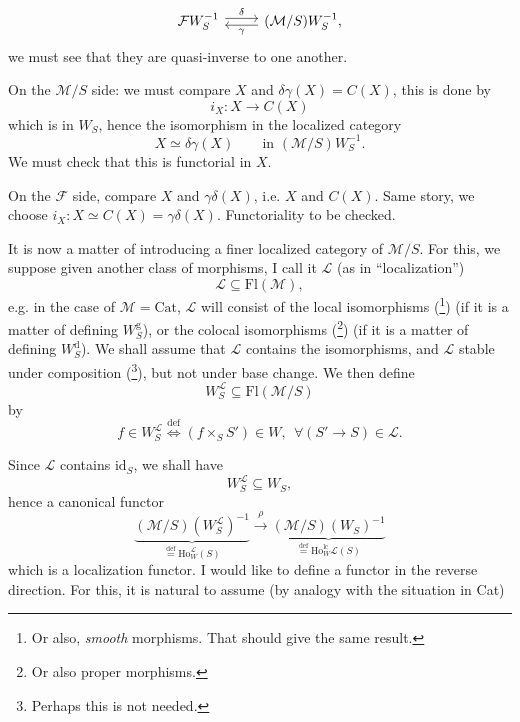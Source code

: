 \documentclass[11pt]{article}
\newcommand{\printedpage}[1]{\marginpar{\footnotesize p.~#1}}
\newcommand{\msp}[1]{\marginpar{\footnotesize [#1]}}
\newcommand{\Ho}{\mathrm{Ho}}
\newcommand{\WL}{W_S^{\mathcal{L}}}
\newcommand{\defeq}{\overset{\text{def}}{=}}
\begin{document}
\printedpage{59}
\[
\begin{tikzcd}
\mathcal{F}W_S^{-1} \arrow[r, shift left, "\delta"] & (\mathcal{M}/S)W_S^{-1}, \arrow[l, shift left, "\gamma"]
\end{tikzcd}
\]
we must see that they are quasi-inverse to one \msp{page 94} another.

On the $\mathcal{M}/S$ side: we must compare $X$ and $\delta\gamma(X) = C(X)$, this is done by
\[
i_X : X \longrightarrow C(X)
\]
which is in $W_S$, hence the isomorphism in the localized category
\[
X \simeq \delta\gamma(X) \qquad \text{in } (\mathcal{M}/S)W_S^{-1}.
\]
We must check that this is functorial in $X$.

On the $\mathcal{F}$ side, compare $X$ and $\gamma\delta(X)$, i.e. $X$ and $C(X)$. Same story, we choose $i_X : X \simeq C(X) = \gamma\delta(X)$. Functoriality to be checked.

It is now a matter of introducing a finer localized category of $\mathcal{M}/S$. For this, we suppose given another class of morphisms, I call it $\mathcal{L}$ (as in ``localization'')
\[
\mathcal{L} \subseteq \mathrm{Fl}(\mathcal{M}),
\]
e.g. in the case of $\mathcal{M} = \mathrm{Cat}$, $\mathcal{L}$ will consist of the local isomorphisms (\footnote[55]{Or also, \textit{smooth} morphisms. That should give the same result.}) (if it is a matter of defining $W_S^{\mathrm{g}}$), or the colocal isomorphisms (\footnote[56]{Or also proper morphisms.}) (if it is a matter of defining $W_S^{\mathrm{d}}$). We shall assume that $\mathcal{L}$ contains the isomorphisms, and $\mathcal{L}$ stable under composition (\footnote[57]{Perhaps this is not needed.}), but not under base change. We then define
\[
\WL \subseteq \mathrm{Fl}(\mathcal{M}/S)
\]
by
\[
f \in \WL \overset{\text{def}}{\Longleftrightarrow} (f \times_S S') \in W,\ \ \forall (S' \longrightarrow S) \in \mathcal{L}.
\]
\msp{page 95}

Since $\mathcal{L}$ contains $\mathrm{id}_S$, we shall have
\[
\WL \subseteq W_S,
\]
hence a canonical functor
\[
\underbrace{(\mathcal{M}/S)(\WL)^{-1}}_{\defeq \Ho_W^{\mathcal{L}}(S)} \xrightarrow{\ \rho\ } \underbrace{(\mathcal{M}/S)(W_S)^{-1}}_{\defeq \Ho_W^{\mathrm{lc}}\mathcal{L}(S)} %
\]
\printedpage{60}
which is a localization functor. I would like to define a functor in the reverse direction. For this, it is natural to assume (by analogy with the situation in Cat)
\end{document}
